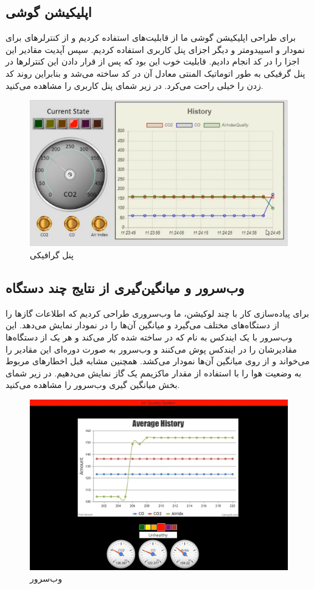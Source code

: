 \subsection{اپلیکیشن گوشی}
برای طراحی اپلیکیشن گوشی ما از قابلیت‌های 
استفاده کردیم و از کنترلر‌های 
برای نمودار و اسپیدومتر و دیگر اجزای پنل کاربری استفاده کردیم. سپس آپدیت مقادیر این اجزا را در کد انجام دادیم. قابلیت خوب 
این بود که پس از قرار دادن این کنترلر‌ها در پنل گرفیکی به طور اتوماتیک المنتی معادل آن در کد ساخته می‌شد و بنابراین روند کد زدن را خیلی راحت می‌کرد. در زیر شمای پنل کاربری را مشاهده می‌کنید. 
\begin{figure}[h!]
	\centering		
	\includegraphics[width=0.6\linewidth]{figs/client.png}
	\caption{پنل گرافیکی}
\end{figure}

\subsection{وب‌سرور و میانگین‌گیری از نتایج چند دستگاه}
برای پیاده‌سازی کار با چند لوکیشن، ما وب‌سروری طراحی کردیم که اطلاعات گاز‌ها را از دستگاه‌‌های مختلف می‌گیرد و میانگین آن‌ها را در نمودار نمایش می‌دهد. این وب‌سرور با یک ایندکس به نام 
که در 
ساخته شده کار می‌کند و هر یک از دستگاه‌ها مقادیرشان را در ایندکس پوش می‌کنند و وب‌سرور به صورت دوره‌ای این مقادیر را می‌خواند و از روی میانگین آن‌ها نمودار می‌کشد. همچنین مشابه قبل اخطار‌های مربوط به وضعیت هوا را با استفاده از مقدار ماکزیمم یک گاز نمایش می‌دهیم. در زیر شمای بخش میانگین گیری وب‌سرور را مشاهده می‌کنید. 

\begin{figure}[h!]
	\centering		
	\includegraphics[width=0.8\linewidth]{figs/web.png}
	\caption{وب‌سرور}
\end{figure} 

